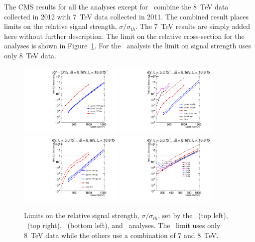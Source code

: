 The CMS results for all the analyses except for \muononly\ combine the 8~TeV data collected in 2012 with 7~TeV data collected in 2011.
The combined result places limits on
the relative signal strength, $\sigma/\sigma_{th}$. The 7~TeV results are simply added here without further description.
The limit on the relative cross-section
for the analyses is shown in Figure~\ref{fig:RelExclusion}. For the \muononly\ analysis the limit on signal strength uses only 8~TeV data.

\begin{figure}
\centering
  \includegraphics[clip=true, trim=0.0cm 0cm 2.8cm 0cm, width=0.44\textwidth]{figures/muonly/MOExclusionRelLog}
  \includegraphics[clip=true, trim=0.0cm 0cm 2.8cm 0cm, width=0.44\textwidth]{figures/tkmu/MuExclusionRelLog} \\
  \includegraphics[clip=true, trim=0.0cm 0cm 2.8cm 0cm, width=0.44\textwidth]{figures/tkonly/TkExclusionRelLog}
  \includegraphics[clip=true, trim=0.0cm 0cm 2.8cm 0cm, width=0.44\textwidth]{figures/multi/HQExclusionRelLog}
\caption[Limits on the relative signal strength, $\sigma/\sigma_{th}$, set by the analyses]
{Limits on the relative signal strength, $\sigma/\sigma_{th}$,  set by the \muononly\ (top left), \tktof\ (top right), \tkonly\ (bottom left), and \multi\ analyses.
The \muononly\ limit uses only 8~TeV data while the others use a combination of 7 and 8~TeV.}
    \label{fig:RelExclusion}
\end{figure}

